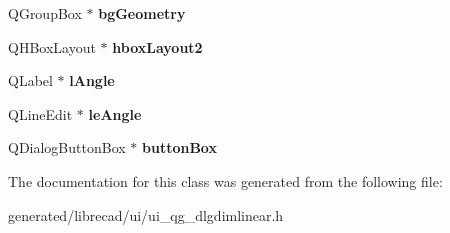 \begin{DoxyCompactItemize}
\item 
\hypertarget{classUi__QG__DlgDimLinear_a50db454981a8135d450fc3bccf5a7582}{Q\-Group\-Box $\ast$ {\bfseries bg\-Geometry}}\label{classUi__QG__DlgDimLinear_a50db454981a8135d450fc3bccf5a7582}

\item 
\hypertarget{classUi__QG__DlgDimLinear_ab2250d1ba95994e7601b2e13291b44f2}{Q\-H\-Box\-Layout $\ast$ {\bfseries hbox\-Layout2}}\label{classUi__QG__DlgDimLinear_ab2250d1ba95994e7601b2e13291b44f2}

\item 
\hypertarget{classUi__QG__DlgDimLinear_ab64c725b35b49aedae0e5f606f7cfe06}{Q\-Label $\ast$ {\bfseries l\-Angle}}\label{classUi__QG__DlgDimLinear_ab64c725b35b49aedae0e5f606f7cfe06}

\item 
\hypertarget{classUi__QG__DlgDimLinear_aa99651304028279e5bb6a0ce6c025476}{Q\-Line\-Edit $\ast$ {\bfseries le\-Angle}}\label{classUi__QG__DlgDimLinear_aa99651304028279e5bb6a0ce6c025476}

\item 
\hypertarget{classUi__QG__DlgDimLinear_a000266b9e03fbfcd030c7ac4d7d00d1c}{Q\-Dialog\-Button\-Box $\ast$ {\bfseries button\-Box}}\label{classUi__QG__DlgDimLinear_a000266b9e03fbfcd030c7ac4d7d00d1c}

\end{DoxyCompactItemize}


The documentation for this class was generated from the following file\-:\begin{DoxyCompactItemize}
\item 
generated/librecad/ui/ui\-\_\-qg\-\_\-dlgdimlinear.\-h\end{DoxyCompactItemize}
